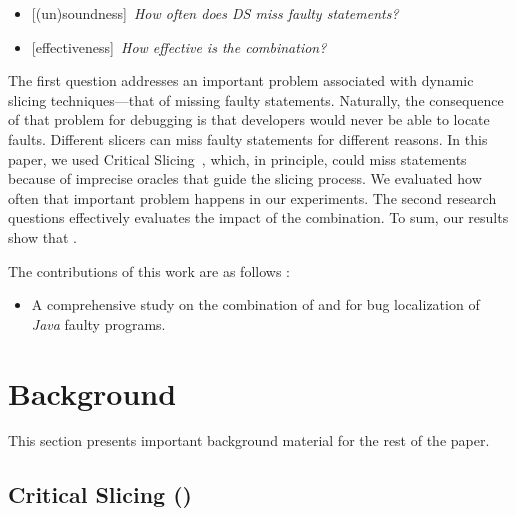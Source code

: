 \documentclass{article}
\begin{document}
\newcommand{\rqone}{How often does DS miss faulty statements?}
\newcommand{\rqthree}{How effective is the \comb{} combination?}

\begin{itemize}[leftmargin=*]
\item[]{\footnotesize[(un)soundness]}~\textit{\rqone{}}
\item[]{\footnotesize[effectiveness]}~\textit{\rqthree{}}
\end{itemize}

The first question addresses an important problem associated with
dynamic slicing techniques---that of missing faulty
statements. Naturally, the consequence of that problem for debugging
is that developers would never be able to locate faults. Different
slicers can miss faulty statements for different reasons. In this
paper, we used Critical Slicing~\cite{DeMillo:1996:CSS:229000.226310},
which, in principle, could miss statements because of imprecise
oracles that guide the slicing process. We evaluated how often that
important problem happens in our experiments. The second research
questions effectively evaluates the impact of the combination. To sum,
our results show that .

The contributions of this work are as follows :
\begin{itemize}
	\item A comprehensive study on the combination of \sfl{} and \ds{}
     for bug localization of \emph{Java} faulty programs.
\end{itemize}

\section{Background}
\label{sec:background}

This section presents important background material for the rest of the paper.

\subsection{Critical Slicing (\cs{})}
\label{sec:slicing}
\end{document}
